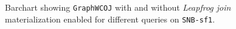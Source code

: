 \begin{figure}[H]
\centering

\caption{Barchart showing \texttt{GraphWCOJ} with and without \textit{Leapfrog join} materialization
enabled for different queries on \texttt{SNB-sf1}.}
\label{fig:mat-vs-nomat}
\end{figure}